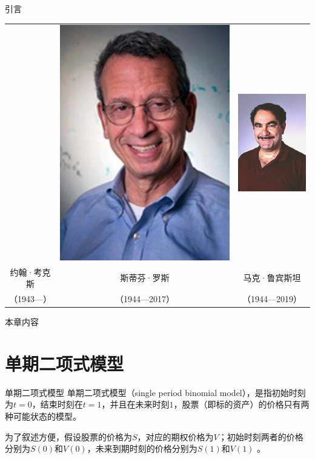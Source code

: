 \documentclass[t]{beamer}
\begin{document}
\begin{frame}{引言}
\begin{center}
\begin{tabular}{ccc}
& \includegraphics[height=0.4\textheight]{fig/Ross.jpg}& \includegraphics[height=0.4\textheight]{fig/Rubin.jpg}\\
约翰·考克斯 & 斯蒂芬·罗斯 & 马克·鲁宾斯坦\\
（1943---\;） &  （1944---2017）   &  （1944---2019）\\
\end{tabular}
	\end{center}
\end{frame}



\begin{frame}{本章内容}
\tableofcontents

\end{frame}

\section{单期二项式模型}
\begin{frame}{单期二项式模型}
	单期二项式模型（single period binomial model），是指初始时刻为$t=0$，结束时刻在$t=1$，并且在未来时刻$1$，股票（即标的资产）的价格只有两种可能状态的模型。
	
	为了叙述方便，假设股票的价格为$S$，对应的期权价格为$V$；初始时刻两者的价格分别为$S(0)$和$V(0)$，未来到期时刻的价格分别为$S(1)$和$V(1)$
。

\end{frame}
\end{document}
